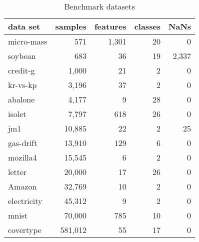\documentclass{article}
\begin{document}
\begin{table}[!htb]
\centering
\caption{Benchmark datasets}
\vskip 0.1in
\label{tab:data-sets}
\begin{center}
\begin{small}
\begin{sc}
\begin{tabular}{@{}lrrrr@{}}
\toprule
data set & samples & features & classes & NaNs \\ \midrule
micro-mass & 571 & 1,301 & 20 & 0 \\
soybean & 683 & 36 & 19 & 2,337 \\
credit-g & 1,000 & 21 & 2 & 0 \\
kr-vs-kp & 3,196 & 37 & 2 & 0 \\
abalone & 4,177 & 9 & 28 & 0 \\
isolet & 7,797 & 618 & 26 & 0 \\
jm1 & 10,885 & 22 & 2 & 25 \\
gas-drift & 13,910 & 129 & 6 & 0 \\
mozilla4 & 15,545 & 6 & 2 & 0 \\
letter & 20,000 & 17 & 26 & 0 \\
Amazon & 32,769 & 10 & 2 & 0 \\
electricity & 45,312 & 9 & 2 & 0 \\
mnist & 70,000 & 785 & 10 & 0 \\
covertype & 581,012 & 55 & 17 & 0 \\ \bottomrule
\end{tabular}\end{sc}
\end{small}
\end{center}
\vskip -0.1in
\end{table}
\end{document}
